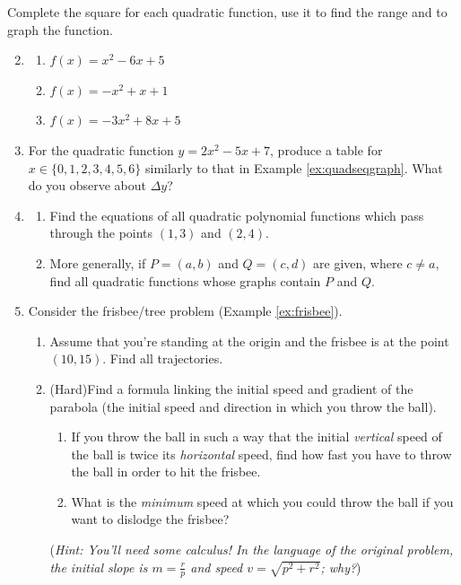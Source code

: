 \begin{exercises}{}{}
	\exstart Complete the square for each quadratic function, use it to find the range and to graph the function.
	\begin{enumerate}\setcounter{enumi}{1}  
	  \item[]\begin{enumerate}
	    \item $f(x)=x^2-6x+5$ %
	    \item $f(x)=-x^2+x+1$ %
	    \item $f(x)=-3x^2+8x+5$ %
	  \end{enumerate}
	  
	  
	  \item For the quadratic function $y=2x^2-5x+7$, produce a table for $x\in\{0,1,2,3,4,5,6\}$ similarly to that in Example \ref{ex:quadseqgraph}. What do you observe about $\Delta y$?
	  
	  
		\item\begin{enumerate}
		  \item Find the equations of all quadratic polynomial functions which pass through the points $(1,3)$ and $(2,4)$.
			\item More generally, if $P=(a,b)$ and $Q=(c,d)$ are given, where $c\neq a$, find all quadratic functions whose graphs contain $P$ and $Q$.
		\end{enumerate}
	  
	  \item\label{exs:frisbee} Consider the frisbee/tree problem (Example \ref{ex:frisbee}).
	  \begin{enumerate}
	    \item Assume that you're standing at the origin and the frisbee is at the point $(10,15)$. Find all trajectories.
	    \item (Hard)\lstsp Find a formula linking the initial speed and gradient of the parabola (the initial speed and direction in which you throw the ball).
	    \begin{enumerate}
				\item If you throw the ball in such a way that the initial \emph{vertical} speed of the ball is twice its \emph{horizontal} speed, find how fast you have to throw the ball in order to hit the frisbee.
	      \item What is the \emph{minimum} speed at which you could throw the ball if you want to dislodge the frisbee?
	    \end{enumerate}
	    (\emph{Hint: You'll need some calculus! In the language of the original problem, the initial slope is $m=\frac rp$ and speed $v=\sqrt{p^2+r^2}$; why?})
		\end{enumerate}

	\end{enumerate}
\end{exercises}

